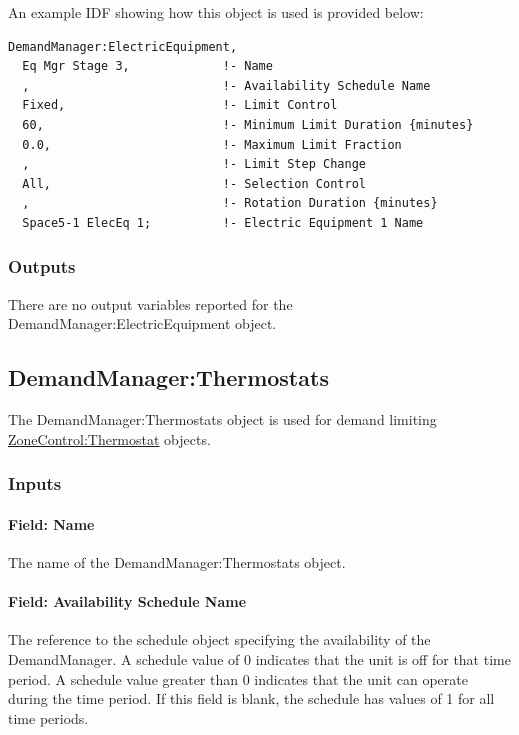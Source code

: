 An example IDF showing how this object is used is provided below:

\begin{lstlisting}
DemandManager:ElectricEquipment,
  Eq Mgr Stage 3,             !- Name
  ,                           !- Availability Schedule Name
  Fixed,                      !- Limit Control
  60,                         !- Minimum Limit Duration {minutes}
  0.0,                        !- Maximum Limit Fraction
  ,                           !- Limit Step Change
  All,                        !- Selection Control
  ,                           !- Rotation Duration {minutes}
  Space5-1 ElecEq 1;          !- Electric Equipment 1 Name
\end{lstlisting}

\subsubsection{Outputs}\label{outputs-3-003}

There are no output variables reported for the DemandManager:ElectricEquipment object.

\subsection{DemandManager:Thermostats}\label{demandmanagerthermostats}

The DemandManager:Thermostats object is used for demand limiting \hyperref[zonecontrolthermostat]{ZoneControl:Thermostat} objects.

\subsubsection{Inputs}\label{inputs-4-007}

\paragraph{Field: Name}\label{field-name-4-007}

The name of the DemandManager:Thermostats object.

\paragraph{Field: Availability Schedule Name}\label{field-availability-schedule-name-3-000}

The reference to the schedule object specifying the availability of the DemandManager. A schedule value of 0 indicates that the unit is off for that time period. A schedule value greater than 0 indicates that the unit can operate during the time period. If this field is blank, the schedule has values of 1 for all time periods.

